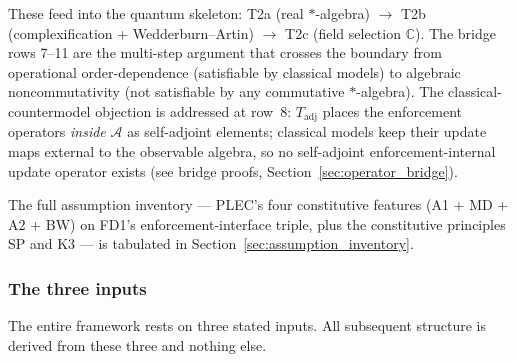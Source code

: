 \documentclass[11pt]{article}
\theoremstyle{remark}
\begin{document}
These feed into the quantum skeleton: T2a (real $*$-algebra) $\to$ T2b (complexification + Wedderburn--Artin) $\to$ T2c (field selection $\mathbb{C}$).  The bridge rows 7--11 are the multi-step argument that crosses the boundary from operational order-dependence (satisfiable by classical models) to algebraic noncommutativity (not satisfiable by any commutative $*$-algebra).  The classical-countermodel objection is addressed at row~8: $T_{\mathrm{adj}}$ places the enforcement operators \emph{inside} $\mathcal{A}$ as self-adjoint elements; classical models keep their update maps external to the observable algebra, so no self-adjoint enforcement-internal update operator exists (see bridge proofs, Section~\ref{sec:operator_bridge}).

\smallskip\noindent The full assumption inventory --- PLEC's four constitutive features (A1 + MD + A2 + BW) on FD1's enforcement-interface triple, plus the constitutive principles SP and K3 --- is tabulated in Section~\ref{sec:assumption_inventory}.\label{sec:axiom}

\subsubsection*{The three inputs}

The entire framework rests on three stated inputs.  All subsequent structure is derived from these three and nothing else.
\end{document}
